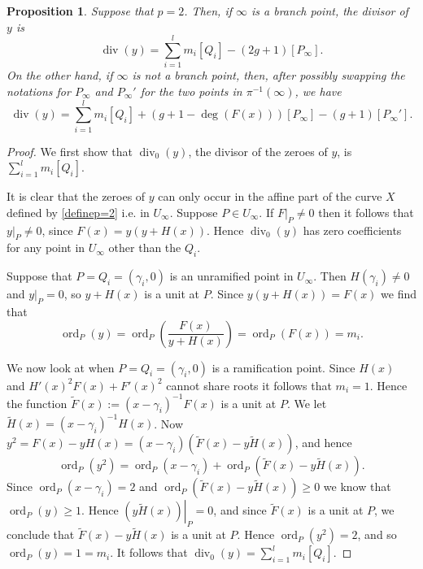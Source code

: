 \documentclass[draft, 11pt]{article} %
\theoremstyle{plain}
\newtheorem{prop}[defn]{Proposition}
\theoremstyle{remark}
\DeclareMathOperator{\ord}{ord}
\DeclareMathOperator{\di}{div}
\begin{document}
\begin{prop}\label{divyp=2}
Suppose that $p=2$.
Then, if $\infty$ is a branch point, the divisor of $y$ is
\begin{equation*}
\di(y) = 
 {\displaystyle \sum_{i=1}^l} m_i[Q_i] -(2g+1)[P_\infty].
\end{equation*}
On the other hand, if $\infty$ is not a branch point, then, after possibly swapping the notations for $P_\infty$ and $P_\infty'$ for the two points in $\pi^{-1}(\infty)$, we have
\begin{equation*}
 \di(y) = {\displaystyle \sum_{i=1}^l} m_i[Q_i] +(g+1-\deg(F(x)))[P_\infty] - (g+1)[P_\infty'].
\end{equation*}
\end{prop}
\begin{proof}
We first show that $\di_0(y)$, the divisor of the zeroes of $y$, is $\sum_{i=1}^l m_i [Q_i]$.

It is clear that the zeroes of $y$ can only occur in the affine part of the curve $X$ defined by \eqref{definep=2} i.e. in $U_\infty$.
Suppose $P\in U_\infty$.
If $\left. F \right|_P \neq 0$ then it follows that $y|_P \neq 0$, since $F(x) = y (y + H(x))$.
Hence $\di_0(y)$ has zero coefficients for any point in $U_\infty$ other than the $Q_i$.

Suppose that $P= Q_i = (\gamma_i, 0)$ is an unramified point in $U_\infty$.
Then $H(\gamma_i) \neq 0$ and $\left. y \right|_P = 0$, so $y + H(x)$ is a unit at $P$.
Since $y(y+H(x)) = F(x)$ we find that
\begin{equation*}
\ord_P(y) = \ord_P\left( \frac{F(x)}{y + H(x)} \right) = \ord_P(F(x)) = m_i.
\end{equation*}

We now look at when $P = Q_i = (\gamma_i, 0)$ is a ramification point.
Since $H(x)$ and $H'(x)^2F(x) + F'(x)^2$ cannot share roots it follows that $m_i = 1$.
Hence the function $\tilde F(x) := (x- \gamma_i)^{-1}F(x)$ is a unit at $P$.
We let $\tilde H(x) = (x- \gamma_i)^{-1}H(x)$.
Now $y^2 = F(x) - y H(x) = (x- \gamma_i) (\tilde F(x) - y \tilde H(x))$, and hence
\[
\ord_P(y^2 ) = \ord_P(x-\gamma_i) + \ord_P(\tilde F(x) - y \tilde H(x)).
\]
Since $\ord_P(x-\gamma_i) = 2$ and $\ord_P(\tilde F(x) - y \tilde H(x)) \geq 0$ we know that $\ord_P(y) \geq 1$.
Hence $\left. (y \tilde H(x)) \right|_P = 0$, and since $\tilde F(x)$ is a unit at $P$, we conclude that $\tilde F(x) - y \tilde H(x)$ is a unit at $P$.
Hence $\ord_P(y^2) = 2$, and so $\ord_P(y) = 1 = m_i$.
It follows that $\di_0(y) =  \sum_{i=1}^l m_i [Q_i]$.


\end{proof}
\end{document}
